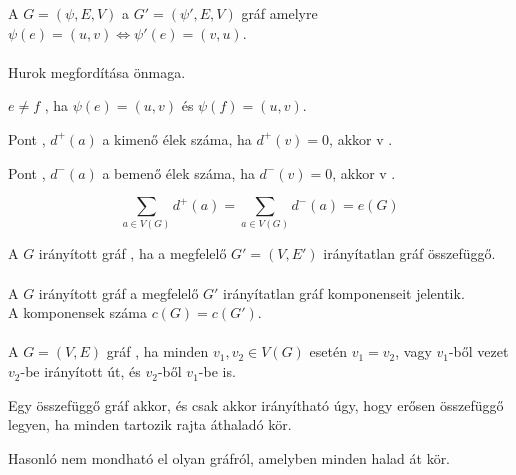 \begin{frame}
\begin{tcolorbox}[squeezed title={Def.: Irányított gráf megfordítása}]
A $G = ({\psi}, E, V)$  a $G' = ({\psi}', E, V)$ gráf amelyre ${\psi}(e) = (u, v) \iff {\psi}'(e) = (v, u)$.\\
\\
Hurok megfordítása önmaga.
\end{tcolorbox}

\begin{tcolorbox}[title={Def.: Sigorúan Párhuzamos Élek}]
$e \neq f$ , ha ${\psi}(e) = (u, v)$ és ${\psi}(f) = (u, v)$.
\end{tcolorbox}

\begin{tcolorbox}[title={Def.: Kifok, Nyelő}]
Pont , $d^+(a)$ a kimenő élek száma, ha $d^+(v) = 0$, akkor v .
\end{tcolorbox}

\begin{tcolorbox}[title={Def.: Befok, Forrás}]
Pont , $d^-(a)$ a bemenő élek száma, ha $d^-(v) = 0$, akkor v .
\end{tcolorbox}

\begin{tcolorbox}[title={Ész}]
$$\sum_{a \in V(G)} d^+(a) = \sum_{a \in V(G)} d^-(a) = e(G)$$
\end{tcolorbox}
\end{frame}


\begin{frame}
\begin{tcolorbox}[ title={Def.: Összefüggőség (Irányított gráf)}]
A $G$ irányított gráf , ha a megfelelő $G' = (V, E')$ irányítatlan gráf összefüggő.\\
\\
A $G$ irányított gráf  a megfelelő $G'$ irányítatlan gráf komponenseit jelentik.\\
A komponensek száma $c(G) = c(G')$.\\
\\
A $G = (V, E)$ gráf , ha minden $v_1, v_2 \in V(G)$ esetén $v_1 = v_2$, vagy $v_1$-ből vezet $v_2$-be irányított út, és $v_2$-ből $v_1$-be is.
\end{tcolorbox}

\begin{tcolorbox}[title={Tétel: Erős összefüggőség}]
Egy összefüggő gráf akkor, és csak akkor irányítható úgy, hogy erősen összefüggő legyen, ha minden  tartozik rajta áthaladó kör.
\end{tcolorbox}

\begin{tcolorbox}[title={Ész}]
Hasonló nem mondható el olyan gráfról, amelyben minden  halad át kör.
\end{tcolorbox}
\end{frame}


